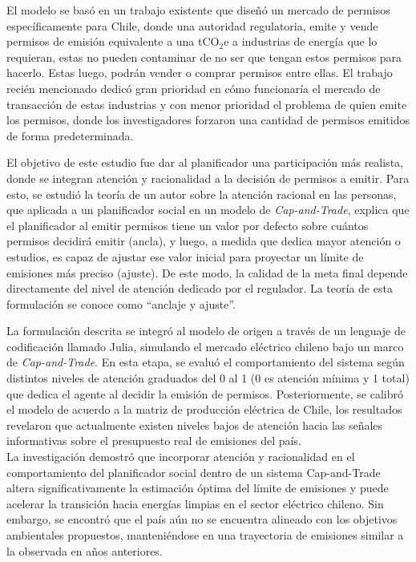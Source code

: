 El modelo se basó en un trabajo existente que diseñó un mercado de permisos específicamente para Chile, donde una autoridad regulatoria,  emite y vende permisos de emisión equivalente a una tCO$_2$e a industrias de energía que lo requieran, estas no pueden contaminar de no ser que tengan estos permisos para hacerlo. Estas luego, podrán vender o comprar permisos entre ellas. El trabajo recién mencionado dedicó gran prioridad en cómo funcionaría el mercado de transacción de estas industrias y con menor prioridad el problema de quien emite los permisos, donde los investigadores forzaron una cantidad de permisos emitidos de forma predeterminada. \medskip

El objetivo de este estudio fue dar al planificador una participación más realista, donde se integran atención y racionalidad a la decisión de permisos a emitir. Para esto, se estudió la teoría de un autor sobre la atención racional en las personas, que aplicada a un planificador social en un modelo de \textit{Cap-and-Trade}, explica que el planificador al emitir permisos tiene un valor por defecto sobre cuántos permisos decidirá emitir (ancla), y luego, a medida que dedica mayor atención o estudios, es capaz de ajustar ese valor inicial para proyectar un límite de emisiones más preciso (ajuste). De este modo, la calidad de la meta final depende directamente del nivel de atención dedicado por el regulador. La teoría de esta formulación se conoce como ``anclaje y ajuste''. \medskip

La formulación descrita se integró al modelo de origen a través de un lenguaje de codificación llamado Julia, simulando el mercado eléctrico chileno bajo un marco de \emph{Cap-and-Trade}. En esta etapa, se evaluó el comportamiento del sistema según distintos niveles de atención graduados del 0 al 1 (0 es atención mínima y 1 total) que dedica el agente al decidir la emisión de permisos. Posteriormente, se calibró el modelo de acuerdo a la matriz de producción eléctrica de Chile, los resultados revelaron que actualmente existen niveles bajos de atención hacia las señales informativas sobre el presupuesto real de emisiones del país.\medskip
\\
La investigación demostró que incorporar atención y racionalidad en el comportamiento del planificador social dentro de un sistema Cap-and-Trade altera significativamente la estimación óptima del límite de emisiones y puede acelerar la transición hacia energías limpias en el sector eléctrico chileno. Sin embargo, se encontró que el país aún no se encuentra alineado con los objetivos ambientales propuestos, manteniéndose en una trayectoria de emisiones similar a la observada en años anteriores.








